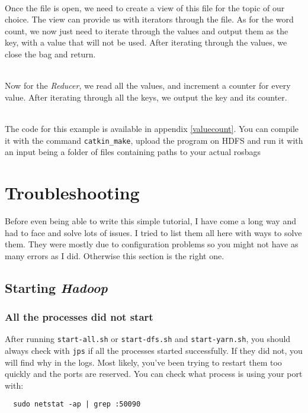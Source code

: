 \documentclass[a4paper, 12pt]{article}
\begin{document}
~\\
Once the file is open, we need to create a view of this file for the topic of our choice. The view can provide us with iterators through the file. As for the word count, we now just need to iterate through the values and output them as the key, with a value that will not be used. After iterating through the values, we close the bag and return.

~\\
Now for the \textit{Reducer}, we read all the values, and increment a counter for every value. After iterating through all the keys, we output the key and its counter.

~\\
The code for this example is available in appendix \ref{valuecount}. You can compile it with the command \texttt{catkin\_make}, upload the program on HDFS and run it with an input being a folder of files containing paths to your actual rosbags

\section{Troubleshooting}

Before even being able to write this simple tutorial, I have come a long way and had to face and solve lots of issues. I tried to list them all here with ways to solve them. They were mostly due to configuration problems so you might not have as many errors as I did. Otherwise this section is the right one.

  \subsection{Starting \textit{Hadoop}}

    \subsubsection*{All the processes did not start}
    
After running \texttt{start-all.sh} or \texttt{start-dfs.sh} and \texttt{start-yarn.sh}, you should always check with \texttt{jps} if all the processes started successfully. If they did not, you will find why in the logs. Most likely, you've been trying to restart them too quickly and the ports are reserved. You can check what process is using your port with:

\begin{verbatim}
  sudo netstat -ap | grep :50090
\end{verbatim}
\end{document}
